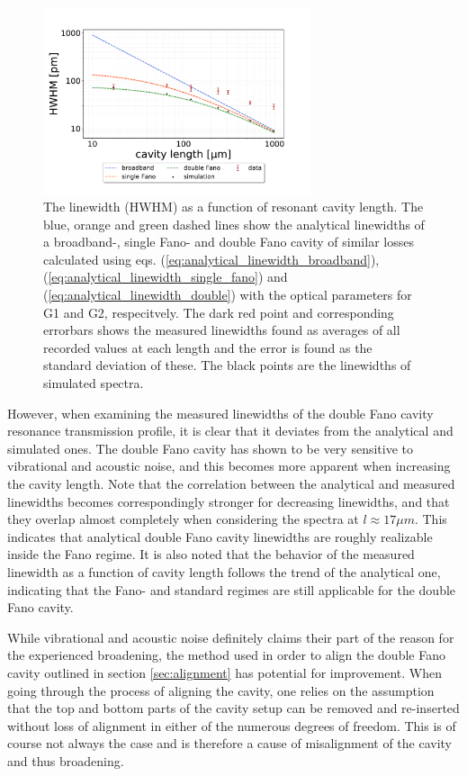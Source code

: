 \begin{figure}[h!]
    \centering
    \includegraphics[width=0.7\textwidth]{figures/results/double fano fits/HWHM_vs_cavity_length_result.pdf}
    \caption{The linewidth (HWHM) as a function of resonant cavity length. The blue, orange and green dashed lines show the analytical linewidths of a broadband-, single Fano- and double Fano cavity of similar losses calculated using eqs. (\ref{eq:analytical_linewidth_broadband}), (\ref{eq:analytical_linewidth_single_fano}) and (\ref{eq:analytical_linewidth_double}) with the optical parameters for G1 and G2, respecitvely. The dark red point and corresponding errorbars shows the measured linewidths found as averages of all recorded values at each length and the error is found as the standard deviation of these. The black points are the linewidths of simulated spectra.}
    \label{fig:HWHM_vs_l_double_fano_result}
\end{figure}

However, when examining the measured linewidths of the double Fano cavity resonance transmission profile, it is clear that it deviates from the analytical and simulated ones. The double Fano cavity has shown to be very sensitive to vibrational and acoustic noise, and this becomes more apparent when increasing the cavity length. Note that the correlation between the analytical and measured linewidths becomes correspondingly stronger for decreasing linewidths, and that they overlap almost completely when considering the spectra at $l \approx 17 \mu m$. This indicates that analytical double Fano cavity linewidths are roughly realizable inside the Fano regime. It is also noted that the behavior of the measured linewidth as a function of cavity length follows the trend of the analytical one, indicating that the Fano- and standard regimes are still applicable for the double Fano cavity. 

While vibrational and acoustic noise definitely claims their part of the reason for the experienced broadening, the method used in order to align the double Fano cavity outlined in section \ref{sec:alignment} has potential for improvement. When going through the process of aligning the cavity, one relies on the assumption that the top and bottom parts of the cavity setup can be removed and re-inserted without loss of alignment in either of the numerous degrees of freedom. This is of course not always the case and is therefore a cause of misalignment of the cavity and thus broadening. 

